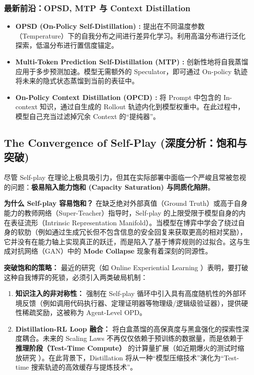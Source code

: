 \subsubsection{最新前沿：OPSD, MTP 与 Context Distillation}
\begin{itemize}
    \item \textbf{OPSD (On-Policy Self-Distillation) \cite{opsd2026}:} 提出在不同温度参数（Temperature）下的自我分布之间进行差异化学习。利用高温分布进行泛化探索，低温分布进行置信度锚定。
    \item \textbf{Multi-Token Prediction Self-Distillation (MTP) \cite{mtp2026}:} 创新性地将自我蒸馏应用于多步预测加速。模型无需额外的 Speculator，即可通过 On-policy 轨迹将未来的隐式状态蒸馏到当前的表征中。
    \item \textbf{On-Policy Context Distillation (OPCD) \cite{opcd2026}:} 将 Prompt 中包含的 In-context 知识，通过自生成的 Rollout 轨迹内化到模型权重中。在此过程中，模型自己充当过滤掉冗余 Context 的“提纯器”。
\end{itemize}

\subsection{The Convergence of Self-Play (深度分析：饱和与突破)}
\label{subsec:self_play_convergence}

尽管 Self-play 在理论上极具吸引力，但其在实际部署中面临一个严峻且常被忽视的问题：\textbf{极易陷入能力饱和 (Capacity Saturation) 与同质化陷阱}。

\textbf{为什么 Self-play 容易饱和？} 
在缺乏绝对外部真值（Ground Truth）或高于自身能力的教师网络（Super-Teacher）指导时，Self-play 的上限受限于模型自身的内在表征流形（Intrinsic Representation Manifold）。当模型在博弈中学会了绕过自身的软肋（例如通过生成冗长但不包含信息的安全回复来获取更高的相对奖励），它并没有在能力轴上实现真正的跃迁，而是陷入了基于博弈规则的过拟合。这与生成对抗网络（GAN）中的 \textbf{Mode Collapse} 现象有着深刻的同源性。

\textbf{突破饱和的策略：} 
最近的研究（如 Online Experiential Learning \cite{onlineexp2026}）表明，要打破这种自我博弈的死锁，必须引入两类破局机制：
\begin{enumerate}
    \item \textbf{知识注入的非对称性：} 强制在 Self-play 循环中引入具有高度随机性的外部环境反馈（例如调用代码执行器、定理证明器等物理级/逻辑级验证器），提供硬性稀疏奖励，这被称为 Agent-Level OPD。
    \item \textbf{Distillation-RL Loop 融合：} 将白盒蒸馏的高保真度与黑盒强化的探索性深度耦合。未来的 Scaling Laws 不再仅仅依赖于预训练的数据量，而是依赖于\textbf{推理阶段（Test-Time Compute）} 的计算量扩展（如近期爆火的测试时缩放研究 \cite{testtime2025}）。在此背景下，Distillation 将从一种“模型压缩技术”演化为“Test-time 搜索轨迹的高效缓存与提炼技术”。
\end{enumerate}
